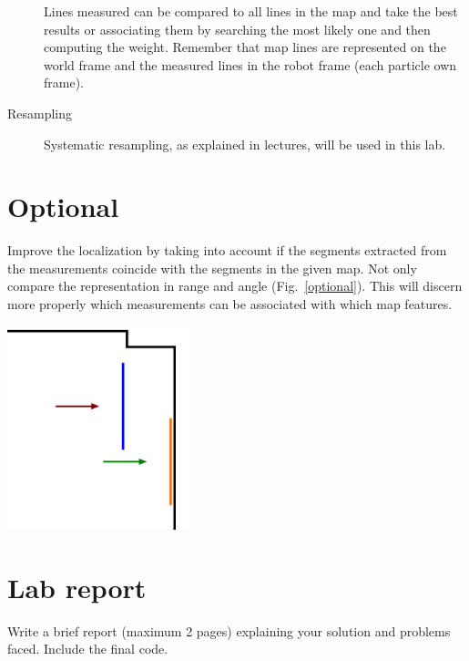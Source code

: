 \documentclass[a4paper,10pt]{article}
\begin{document}
\begin{description}
    Lines measured can be compared to all lines in the map and take the best results or associating them by searching the most likely one and then computing the weight. Remember that map lines are represented on the world frame and the measured lines in the robot frame (each particle own frame).
    
    \item[Resampling] Systematic resampling, as explained in lectures, will be used in this lab.
\end{description}

\section{Optional}

Improve the localization by taking into account if the segments extracted from the measurements coincide with the segments in the given map. Not only compare the representation in range and angle (Fig.~\ref{optional}). This will discern more properly which measurements can be associated with which map features.

\begin{center}
	\includegraphics[width=0.40\textwidth]{pict/lab3-optional}
	\label{optional}
\end{center}

\section{Lab report}

Write a brief report (maximum 2 pages) explaining your solution and problems faced. Include the final code.
\end{document}
